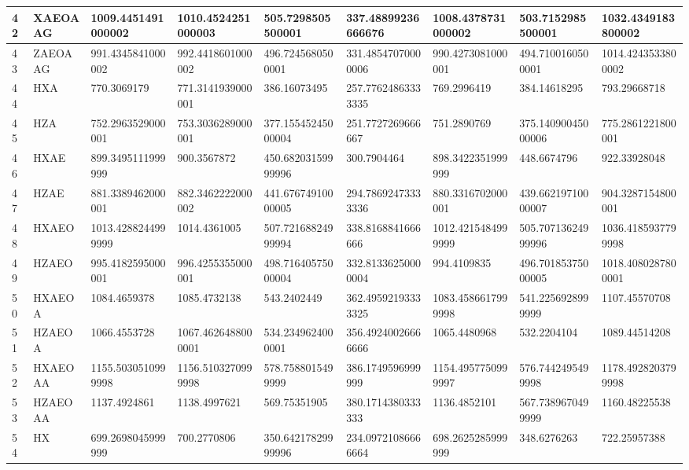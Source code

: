 {\begin{longtable}{|l|l|l|l|l|l|l|l|l|}
        42 & XAEOAAG & 1009.4451491000002 & 1010.4524251000003 & 505.7298505500001 & 337.48899236666676 & 1008.4378731000002 & 503.7152985500001 & 1032.4349183800002 \\ \hline
        43 & ZAEOAAG & 991.4345841000002 & 992.4418601000002 & 496.7245680500001 & 331.48547070000006 & 990.4273081000001 & 494.7100160500001 & 1014.4243533800002 \\ \hline
        44 & HXA & 770.3069179 & 771.3141939000001 & 386.16073495 & 257.77624863333335 & 769.2996419 & 384.14618295 & 793.29668718 \\ \hline
        45 & HZA & 752.2963529000001 & 753.3036289000001 & 377.15545245000004 & 251.7727269666667 & 751.2890769 & 375.14090045000006 & 775.2861221800001 \\ \hline
        46 & HXAE & 899.3495111999999 & 900.3567872 & 450.68203159999996 & 300.7904464 & 898.3422351999999 & 448.6674796 & 922.33928048 \\ \hline
        47 & HZAE & 881.3389462000001 & 882.3462222000002 & 441.67674910000005 & 294.78692473333336 & 880.3316702000001 & 439.66219710000007 & 904.3287154800001 \\ \hline
        48 & HXAEO & 1013.4288244999999 & 1014.4361005 & 507.72168824999994 & 338.8168841666666 & 1012.4215484999999 & 505.70713624999996 & 1036.4185937799998 \\ \hline
        49 & HZAEO & 995.4182595000001 & 996.4255355000001 & 498.71640575000004 & 332.81336250000004 & 994.4109835 & 496.70185375000005 & 1018.4080287800001 \\ \hline
        50 & HXAEOA & 1084.4659378 & 1085.4732138 & 543.2402449 & 362.49592193333325 & 1083.4586617999998 & 541.2256928999999 & 1107.45570708 \\ \hline
        51 & HZAEOA & 1066.4553728 & 1067.4626488000001 & 534.2349624000001 & 356.49240026666666 & 1065.4480968 & 532.2204104 & 1089.44514208 \\ \hline
        52 & HXAEOAA & 1155.5030510999998 & 1156.5103270999998 & 578.7588015499999 & 386.1749596999999 & 1154.4957750999997 & 576.7442495499998 & 1178.4928203799998 \\ \hline
        53 & HZAEOAA & 1137.4924861 & 1138.4997621 & 569.75351905 & 380.1714380333333 & 1136.4852101 & 567.7389670499999 & 1160.48225538 \\ \hline
        54 & HX & 699.2698045999999 & 700.2770806 & 350.64217829999996 & 234.09721086666664 & 698.2625285999999 & 348.6276263 & 722.25957388 \\ \hline

\end{longtable}}
